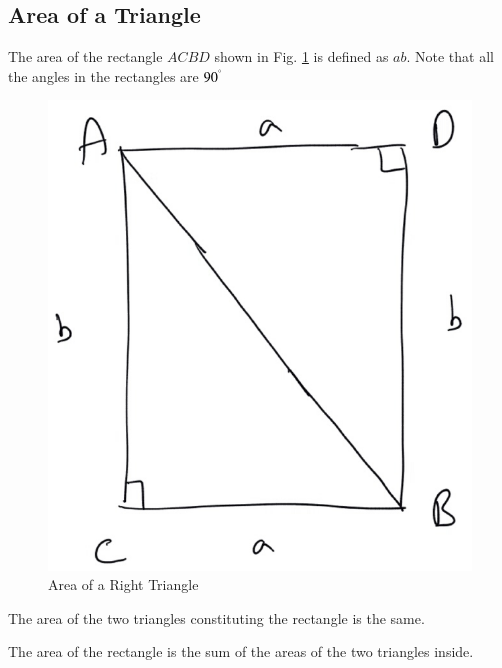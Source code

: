 \subsection{Area of a Triangle}



\begin{definition}
	The area of the rectangle $ACBD$ shown in Fig. \ref{ch2_sq_ar} is defined as $ab$. Note that all the angles in the rectangles are $90^{\degree}$
	\label{ch2_sq_ar}
\end{definition}
\begin{figure}[!h]
	\begin{center}
		
		\includegraphics[width=\columnwidth]{./figs/ch2_sq_ar}
		\vspace*{-10cm}
	\end{center}
	\caption{Area of a Right Triangle}
	\label{ch2_sq_ar}	
\end{figure}

\begin{definition}
	The area of the two triangles constituting the rectangle is the same.
	\label{ch2_triang_eq}
\end{definition}
\begin{definition}
	The area of the rectangle is the sum of the areas of the two triangles inside.
	\label{ch2_triang_sum}
\end{definition}

